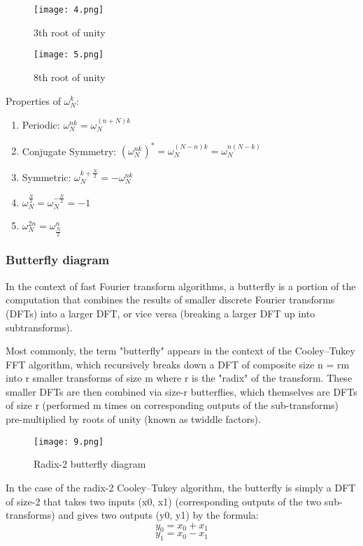 \documentclass[12pt,a4paper]{article}
\begin{document}
\begin{center}
\begin{figure}[hbtp]
\centering
\texttt{[image: 4.png]}
\caption{3th root of unity}
\end{figure}
\end{center}
\begin{figure}[hbtp]
\centering
\texttt{[image: 5.png]}
\caption{8th root of unity}
\end{figure}
Properties of $\omega_N^k$:
\begin{enumerate}
\item Periodic: $\omega_N^{nk}=\omega_N^{(n+N)k}$
\item Conjugate Symmetry: $(\omega_N^{nk})^*=\omega_N^{(N-n)k}=\omega_N^{n(N-k)}$
\item Symmetric: $\omega_N^{k+\frac{N}{2}}=-\omega_N^{nk}$
\item $\omega_N^{\frac{N}{2}}=\omega_N^{-\frac{N}{2}}=-1$
\item $\omega_N^{2n}=\omega_{\frac{N}{2}}^{n}$
\end{enumerate}

\subsubsection{Butterfly diagram}
In the context of fast Fourier transform algorithms, a butterfly is a portion of the computation that combines the results of smaller discrete Fourier transforms (DFTs) into a larger DFT, or vice versa (breaking a larger DFT up into subtransforms). 


Most commonly, the term "butterfly" appears in the context of the Cooley–Tukey FFT algorithm, which recursively breaks down a DFT of composite size n = rm into r smaller transforms of size m where r is the "radix" of the transform. These smaller DFTs are then combined via size-r butterflies, which themselves are DFTs of size r (performed m times on corresponding outputs of the sub-transforms) pre-multiplied by roots of unity (known as twiddle factors). 
\begin{figure}[hbtp]
\centering
\texttt{[image: 9.png]}
\caption{Radix-2 butterfly diagram}
\end{figure}

In the case of the radix-2 Cooley–Tukey algorithm, the butterfly is simply a DFT of size-2 that takes two inputs (x0, x1) (corresponding outputs of the two sub-transforms) and gives two outputs (y0, y1) by the formula:
$$y_0=x_0+x_1$$
$$y_1=x_0-x_1$$
\end{document}
